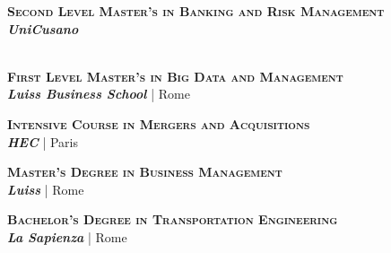 
\textsc{\textbf{Second Level Master’s in Banking and Risk Management}} \\ 
\textbf{\textit{UniCusano}} %
\\
 \\ 

\is
\textsc{\textbf{First Level Master’s in Big Data and Management}} \\ 
\textbf{\textit{Luiss Business School}} | Rome %
\\

\is
\textsc{\textbf{Intensive Course in Mergers and Acquisitions}} \\ 
\textbf{\textit{HEC}} | Paris %

\is
\textsc{\textbf{Master’s Degree in Business Management}} \\ 
\textbf{\textit{Luiss}} | Rome %
\\

\is
\textsc{\textbf{Bachelor’s Degree in Transportation Engineering}} \\ 
\textbf{\textit{La Sapienza}} | Rome %
\\

